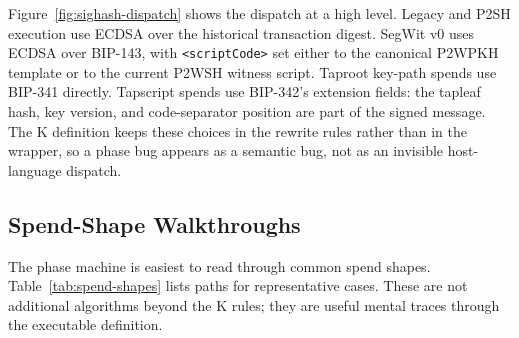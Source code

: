 \documentclass[conference]{IEEEtran}
\newcommand{\kcell}[1]{\texttt{<#1>}\xspace}
\begin{document}
Figure~\ref{fig:sighash-dispatch} shows the dispatch at a high level.  Legacy
and P2SH execution use ECDSA over the historical transaction digest.  SegWit
v0 uses ECDSA over BIP-143, with \kcell{scriptCode} set either to the
canonical P2WPKH template or to the current P2WSH witness script.  Taproot
key-path spends use BIP-341 directly.  Tapscript spends use BIP-342's
extension fields: the tapleaf hash, key version, and code-separator position
are part of the signed message.  The K definition keeps these choices in the
rewrite rules rather than in the wrapper, so a phase bug appears as a semantic
bug, not as an invisible host-language dispatch.

\subsection{Spend-Shape Walkthroughs}

The phase machine is easiest to read through common spend shapes.
Table~\ref{tab:spend-shapes} lists paths for representative cases.  These are
not additional algorithms beyond the K rules; they are useful mental traces
through the executable definition.
\end{document}
